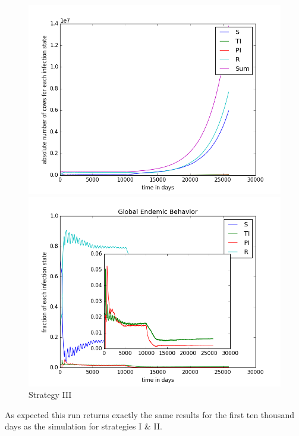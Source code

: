 \begin{figure}[htbp]
\begin{minipage}{0.5\textwidth}
\centering
\noindent\includegraphics[width=0.95\linewidth,height=\textheight,
keepaspectratio]{cont3totalEndemicNumbers.png} 
\end{minipage}
\begin{minipage}{0.5\textwidth}
\centering
\noindent\includegraphics[width=0.95\linewidth,height=\textheight,
keepaspectratio]{cont3endemicFractions.png} 
\end{minipage}
\caption[Endemic Behavior in Containment Strategy Three]{Strategy III}
\label{fig:contScen3}
\end{figure}
As expected this run returns exactly the same results for the first ten thousand days as the simulation for strategies I \& II. 


